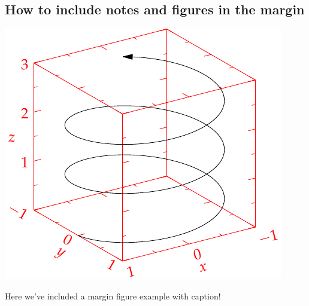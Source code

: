 \documentclass{tufte-handout}
\begin{document}
\subsection{How to include notes and figures in the margin}


\lipsum[1] %

\begin{marginfigure}
\includegraphics{helix}
\caption{Here we've included a margin figure example with caption!}
\end{marginfigure}

\lipsum[2] %



% 

\end{document}
